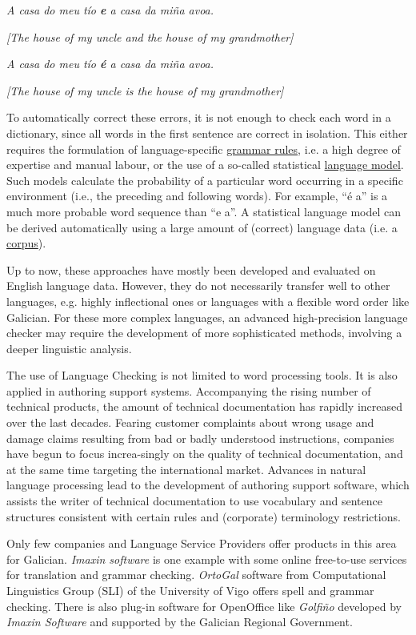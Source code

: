 \begin{multicols}{2}
\begin{itemize}
\begin{multicols}{2}
\textit{A casa do meu tío \textbf{e} a casa da miña avoa.}

\textit{[The house of my uncle and the house of my grandmother]}

\textit{A casa do meu tío \textbf{é} a casa da miña avoa.}

\textit{[The house of my uncle is the house of my grandmother]}


To automatically correct these errors, it is not enough to check each word in a dictionary, since all words in the first sentence are correct in isolation. This either requires the formulation of language-specific \uline{grammar rules}, i.e. a high degree of expertise and manual labour, or the use of a so-called statistical \uline{language model}. Such models calculate the probability of a particular word occurring in a specific environment (i.e., the preceding and following words). For example, “é a” is a much more probable word sequence than “e a”. A statistical language model can be derived automatically using a large amount of (correct) language data (i.e. a \uline{corpus}).

Up to now, these approaches have mostly been developed and evaluated on English language data. However, they do not necessarily transfer well to other languages, e.g. highly inflectional ones or languages with a flexible word order like Galician. For these more complex languages, an advanced high-precision language checker may require the development of more sophisticated methods, involving a deeper linguistic analysis.

The use of Language Checking is not limited to word processing tools. It is also applied in authoring support systems. Accompanying the rising number of technical products, the amount of technical documentation has rapidly increased over the last decades. Fearing customer complaints about wrong usage and damage claims resulting from bad or badly understood instructions, companies have begun to focus increa-singly on the quality of technical documentation, and at the same time targeting the international market. Advances in natural language processing lead to the development of authoring support software, which assists the writer of technical documentation to use vocabulary and sentence structures consistent with certain rules and (corporate) terminology restrictions. 


Only few companies and Language Service Providers offer products in this area for Galician.  \textit{Imaxin software} \cite{GAL-Nota21} is one example with some online free-to-use services for translation and grammar checking. \textit{OrtoGal} software from Computational Linguistics Group (SLI)\cite{GAL-Nota22} of the University of Vigo offers spell and grammar checking. There is also plug-in software for OpenOffice like \textit{Golfiño} \cite{GAL-Nota23} developed by \textit{Imaxin Software} and supported by the Galician Regional Government.


\end{multicols}
\end{itemize}
\end{multicols}
